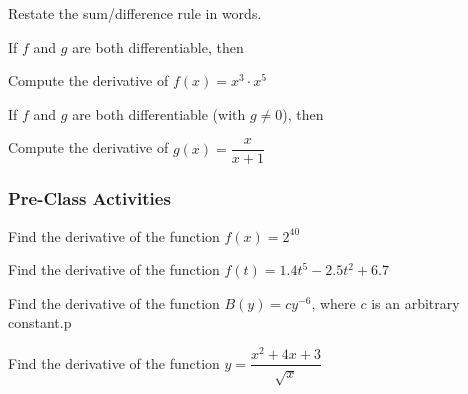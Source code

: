 \documentclass[notes]{subfiles}
\begin{document}
		\begin{question}
			Restate the sum/difference rule in words.
		\end{question}
			\newpage
			
		\begin{thm}
			If $f$ and $g$ are both differentiable, then
		\end{thm}
			
		\begin{ex}
			Compute the derivative of $f(x) = x^3\cdot x^5$
		\end{ex}

		\begin{thm}
			If $f$ and $g$ are both differentiable (with $g\neq 0$), then
		\end{thm}

		\begin{ex}
			Compute the derivative of $g(x) = \dfrac{x}{x+1}$
		\end{ex}
			\newpage
			
	\subsubsection*{Pre-Class Activities}
		\begin{ex}
			Find the derivative of the function $f(x) = 2^{40}$
		\end{ex}
			
		\begin{ex}
			Find the derivative of the function $f(t) = 1.4t^5-2.5t^2+6.7$
		\end{ex}
			
		\begin{ex}
			Find the derivative of the function $B(y) = cy^{-6}$, where $c$ is an arbitrary constant.p
		\end{ex}
		\begin{ex}
			Find the derivative of the function $y = \dfrac{x^2 + 4x+3}{\sqrt{x}}$
		\end{ex}
			\newpage
	
\end{document}
